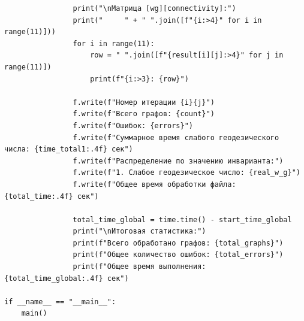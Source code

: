 \documentclass[bachelor, och, nir]{SCWorks}
\begin{document}
\begin{verbatim}
                print("\nМатрица [wg][connectivity]:")
                print("     " + " ".join([f"{i:>4}" for i in range(11)]))
                for i in range(11):
                    row = " ".join([f"{result[i][j]:>4}" for j in range(11)])
                    print(f"{i:>3}: {row}")
                
                f.write(f"Номер итерации {i}{j}")
                f.write(f"Всего графов: {count}")
                f.write(f"Ошибок: {errors}")
                f.write(f"Суммарное время слабого геодезического числа: {time_total1:.4f} сек")
                f.write(f"Распределение по значению инварианта:")
                f.write(f"1. Слабое геодезическое число: {real_w_g}")
                f.write(f"Общее время обработки файла: {total_time:.4f} сек")
               
                total_time_global = time.time() - start_time_global
                print("\nИтоговая статистика:")
                print(f"Всего обработано графов: {total_graphs}")
                print(f"Общее количество ошибок: {total_errors}")
                print(f"Общее время выполнения: {total_time_global:.4f} сек")

if __name__ == "__main__":
    main()

\end{verbatim}
\end{document}
